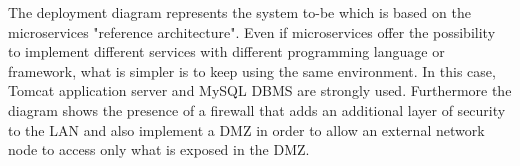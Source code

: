 The deployment diagram represents the system to-be which is based on the microservices "reference architecture". Even if 
microservices offer the possibility to implement different services with different programming language or framework, what is simpler 
is to keep using the same environment. In this case, Tomcat application server and MySQL DBMS are strongly used. Furthermore the diagram shows the presence of a firewall that adds an additional layer of security to the LAN and also implement a DMZ in order to allow an external network node to access only what is exposed in the DMZ.